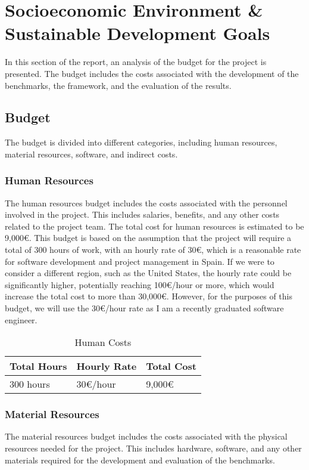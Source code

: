 \chapter{Socioeconomic Environment \& Sustainable Development Goals}\label{chap:economic-env}
In this section of the report, an analysis of the budget for the project is presented. The budget includes the costs associated with the development of the benchmarks, the framework, and the evaluation of the results.

\section{Budget}
The budget is divided into different categories, including human resources, material resources, software, and indirect costs.

\subsection{Human Resources}
The human resources budget includes the costs associated with the personnel involved in the project. This includes salaries, benefits, and any other costs related to the project team. The total cost for human resources is estimated to be 9,000€. This budget is based on the assumption that the project will require a total of 300 hours of work, with an hourly rate of 30€, which is a reasonable rate for software development and project management in Spain. If we were to consider a different region, such as the United States, the hourly rate could be significantly higher, potentially reaching 100€/hour or more, which would increase the total cost to more than 30,000€. However, for the purposes of this budget, we will use the 30€/hour rate as I am a recently graduated software engineer.

\begin{table}[h]
  \centering
  \begin{tabular}{lll}
    \textbf{Total Hours} & \textbf{Hourly Rate} & \textbf{Total Cost} \\
    \hline
    300 hours & 30€/hour & 9,000€ \\
  \end{tabular}
  \caption{Human Costs}
  \label{tab:human-resources}
\end{table}

\subsection{Material Resources}
The material resources budget includes the costs associated with the physical resources needed for the project. This includes hardware, software, and any other materials required for the development and evaluation of the benchmarks.



